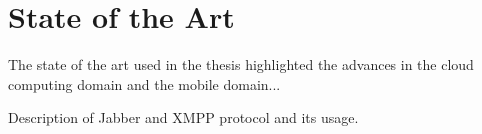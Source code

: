 

\chapter{State of the Art} %


The state of the art used in the thesis highlighted the advances in the cloud computing domain and the mobile domain...


\ifpdf
    \graphicspath{{X/figures/PNG/}{X/figures/PDF/}{X/figures/}}
\else
    \graphicspath{{X/figures/EPS/}{X/figures/}}
\fi


Description of Jabber and XMPP protocol and its usage.





